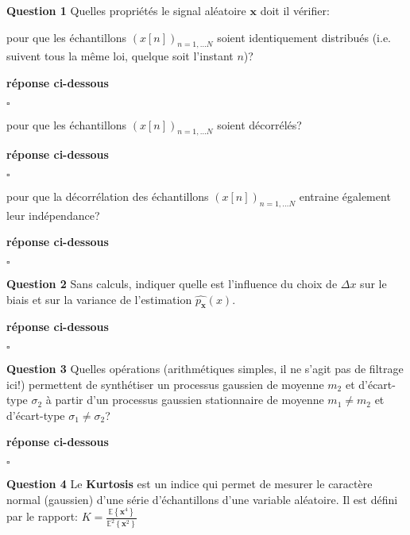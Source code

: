 \documentclass{article}
\newcommand{\debutrep}[1]{\color{blue}\begin{center} \hrulefill \textbf{ #1 } \hrulefill \end{center} }
\newcommand{\finrep}{\vspace*{5mm}\hfill $\square$\color{black}\vspace*{5mm}}
\begin{document}
\begin{list}{}{\setlength{\leftmargin}{2mm} \setlength{\labelwidth}{0mm} \setlength{\labelsep}{3mm} \setlength{\itemsep}{1mm} }
\item[\textbf{Question 1}] Quelles propriétés le signal aléatoire $\mathbf{x}$ doit il vérifier:
\begin{list}{-}{\setlength{\leftmargin}{3mm} \setlength{\labelwidth}{20mm} \setlength{\labelsep}{2mm} \setlength{\itemsep}{1mm} }
\item   pour que les échantillons  $\left(x[n]\right)_{n=1,\ldots N}$ soient identiquement distribués (i.e. suivent tous la même loi, quelque soit l'instant $n$)?

\debutrep{réponse ci-dessous}

\finrep

\item   pour que les échantillons  $\left(x[n]\right)_{n=1,\ldots N}$ soient décorrélés?

\debutrep{réponse ci-dessous}

 \finrep


\item  pour que la décorrélation des échantillons $\left(x[n]\right)_{n=1,\ldots N}$ entraine  également leur indépendance?

\debutrep{réponse ci-dessous}
  
\finrep
 
\end{list}

\item[\textbf{Question 2}] Sans calculs, indiquer quelle est l'influence du choix de $\Delta x$ sur le biais et sur la variance de l'estimation $\widehat{p_{\mathbf{x}}}(x)$.

\debutrep{réponse ci-dessous}
  
\finrep
 
\item[\textbf{Question 3}] Quelles opérations (arithmétiques simples, il ne s'agit pas de filtrage ici!) permettent de synthétiser un processus gaussien de moyenne $m_2$ et d'écart-type $\sigma_2$ à partir d'un processus gaussien stationnaire de moyenne $m_1 \neq m_2$ et d'écart-type $\sigma_1 \neq \sigma_2$?


\debutrep{réponse ci-dessous}
 
 \finrep
 

\item[\textbf{Question 4}] Le {\bf Kurtosis} est un indice qui permet de mesurer le caractère normal (gaussien) d'une série d'échantillons d'une variable aléatoire. Il est défini par le rapport: ${\displaystyle K=\frac{\mathbb{E}\left\{\mathbf{x}^4\right\}}{\mathbb{E}^2\left\{\mathbf{x}^2\right\}}}$


\end{list}
\end{document}
